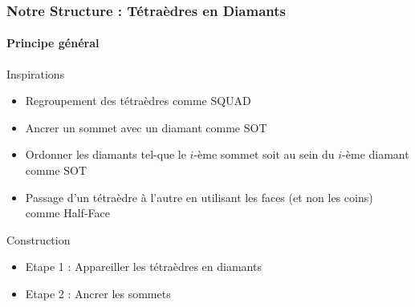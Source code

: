 \documentclass[9pt]{beamer}
\begin{document}
\begin{frame}
\frametitle{Notre Structure : Tétraèdres en Diamants}
\framesubtitle{Principe général}
\begin{block}{Inspirations}
\begin{itemize}
\item Regroupement des tétraèdres comme SQUAD
\item Ancrer un sommet avec un diamant comme SOT
\item Ordonner les diamants tel-que le $i$-ème sommet soit au sein du $i$-ème diamant comme SOT
\item Passage d'un tétraèdre à l'autre en utilisant les faces (et non les coins) comme Half-Face\\
\end{itemize}
\end{block}
\begin{block}{Construction}
\begin{itemize}
\item Etape 1 : Appareiller les tétraèdres en diamants
\item Etape 2 : Ancrer les sommets
\end{itemize}
\end{block}
\end{frame}
\end{document}
